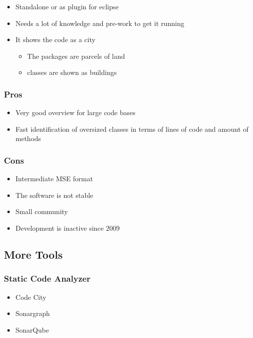 \begin{itemize}
\tightlist
\item
  Standalone or as plugin for eclipse
\item
  Needs a lot of knowledge and pre-work to get it running
\item
  It shows the code as a city

  \begin{itemize}
  \tightlist
  \item
    The packages are parcels of land
  \item
    classes are shown as buildings
  \end{itemize}
\end{itemize}

\hypertarget{pros}{%
\subsubsection{Pros}\label{pros}}

\begin{itemize}
\tightlist
\item
  Very good overview for large code bases
\item
  Fast identification of oversized classes in terms of lines of code and
  amount of methods
\end{itemize}

\hypertarget{cons}{%
\subsubsection{Cons}\label{cons}}

\begin{itemize}
\tightlist
\item
  Intermediate MSE format
\item
  The software is not stable
\item
  Small community
\item
  Development is inactive since 2009
\end{itemize}



\subsection{More Tools}
\subsubsection{Static Code Analyzer}
\begin{itemize}
    \item Code City
    \item Sonargraph
    \item SonarQube
\end{itemize}


